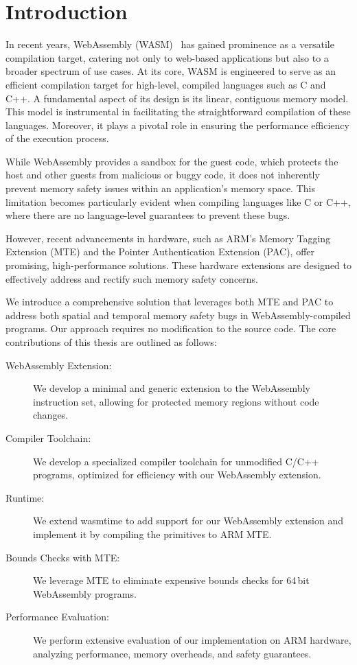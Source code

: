 \chapter{Introduction}
\label{ch:intro}

In recent years, WebAssembly (WASM)~\cite{haas2017bringing} has gained prominence as a versatile compilation target, catering not only to web-based applications but also to a broader spectrum of use cases.
At its core, WASM is engineered to serve as an efficient compilation target for high-level, compiled languages such as C and C++.
A fundamental aspect of its design is its linear, contiguous memory model.
This model is instrumental in facilitating the straightforward compilation of these languages.
Moreover, it plays a pivotal role in ensuring the performance efficiency of the execution process.

While WebAssembly provides a sandbox for the guest code, which protects the host and other guests from malicious or buggy code, it does not inherently prevent memory safety issues within an application's memory space.
This limitation becomes particularly evident when compiling languages like C or C++, where there are no language-level guarantees to prevent these bugs.

However, recent advancements in hardware, such as ARM's Memory Tagging Extension (MTE) and the Pointer Authentication Extension (PAC), offer promising, high-performance solutions. These hardware extensions are designed to effectively address and rectify such memory safety concerns.

We introduce a comprehensive solution that leverages both MTE and PAC to address both spatial and temporal memory safety bugs in WebAssembly-compiled programs.
Our approach requires no modification to the source code.
The core contributions of this thesis are outlined as follows:

\begin{description}
    \item[WebAssembly Extension:] We develop a minimal and generic extension to the WebAssembly instruction set, allowing for protected memory regions without code changes.
    \item[Compiler Toolchain:] We develop a specialized compiler toolchain for unmodified C/C++ programs, optimized for efficiency with our WebAssembly extension.
    \item[Runtime:] We extend wasmtime to add support for our WebAssembly extension and implement it by compiling the primitives to ARM MTE.
    \item[Bounds Checks with MTE:] We leverage MTE to eliminate expensive bounds checks for 64\,bit WebAssembly programs.
    \item[Performance Evaluation:] We perform extensive evaluation of our implementation on ARM hardware, analyzing performance, memory overheads, and safety guarantees.
\end{description}

